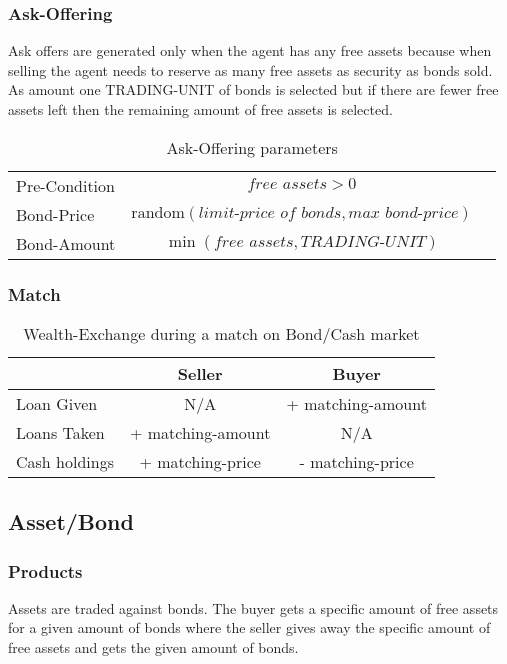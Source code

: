 \documentclass[Bachelorarbeit.tex]{subfiles}
\begin{document}
\subsubsection{Ask-Offering}
Ask offers are generated only when the agent has any free assets because when selling the agent needs to reserve as many free assets as security as bonds sold. As amount one TRADING-UNIT of bonds is selected but if there are fewer free assets left then the remaining amount of free assets is selected.

\begin{table}[H]
	\centering
	\caption{Ask-Offering parameters}
	\begin{tabular} { l c r }
		\hline
		Pre-Condition & $\textit{free assets} > 0$  \\
		Bond-Price & $\mathrm{random}(\textit{limit-price of bonds}, \textit{max bond-price})$ \\
		Bond-Amount & $\min ({\textit{free assets} }, \textit{TRADING-UNIT} )$ \\
		\hline
	\end{tabular}
\end{table}

\subsubsection{Match}

\begin{table}[H]
	\centering
	\caption{Wealth-Exchange during a match on Bond/Cash market}
	\begin{tabular} { l c c }
		& Seller & Buyer \\
		\hline
		Loan Given & N/A & + matching-amount \\
		Loans Taken & + matching-amount & N/A \\
		Cash holdings & + matching-price & - matching-price \\
		\hline
	\end{tabular}
\end{table}

\subsection{Asset/Bond}
\subsubsection{Products}
Assets are traded against bonds. The buyer gets a specific amount of free assets for a given amount of bonds where the seller gives away the specific amount of free assets and gets the given amount of bonds.
\end{document}
